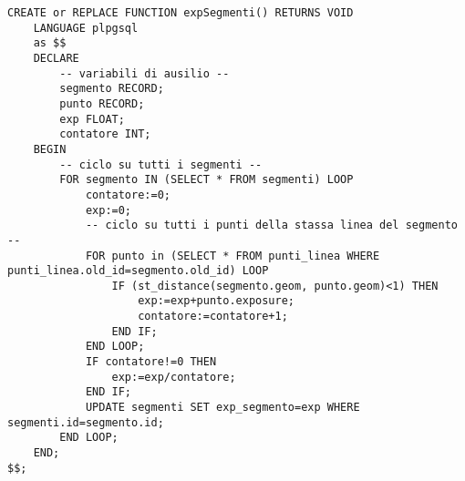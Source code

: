 \begin{lstlisting}[style=mySQL]
CREATE or REPLACE FUNCTION expSegmenti() RETURNS VOID
	LANGUAGE plpgsql
	as $$
	DECLARE
		-- variabili di ausilio --
		segmento RECORD;
		punto RECORD;
		exp FLOAT;
		contatore INT;
	BEGIN
		-- ciclo su tutti i segmenti --
		FOR segmento IN (SELECT * FROM segmenti) LOOP
			contatore:=0;
			exp:=0;
			-- ciclo su tutti i punti della stassa linea del segmento --
			FOR punto in (SELECT * FROM punti_linea WHERE punti_linea.old_id=segmento.old_id) LOOP
				IF (st_distance(segmento.geom, punto.geom)<1) THEN
					exp:=exp+punto.exposure;
					contatore:=contatore+1;
				END IF;
			END LOOP;
			IF contatore!=0 THEN
				exp:=exp/contatore;
			END IF;
			UPDATE segmenti SET exp_segmento=exp WHERE segmenti.id=segmento.id;
		END LOOP;
	END;
$$;
\end{lstlisting}